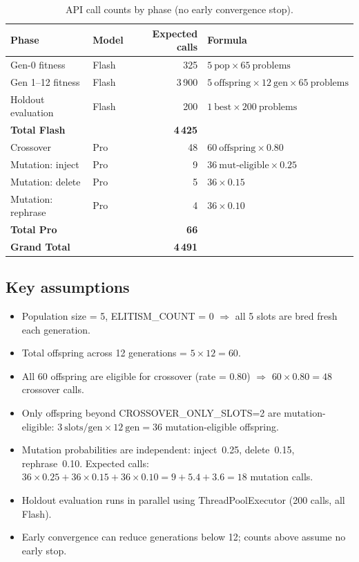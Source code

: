 \documentclass[11pt,a4paper]{report}
\begin{document}
\begin{table}[h]
\centering
\begin{tabular}{@{}llrl@{}}
\toprule
\textbf{Phase} & \textbf{Model} & \textbf{Expected calls} & \textbf{Formula} \\
\midrule
Gen-0 fitness       & Flash & 325    & $5\ \text{pop} \times 65\ \text{problems}$ \\
Gen 1--12 fitness   & Flash & 3\,900 & $5\ \text{offspring} \times 12\ \text{gen} \times 65\ \text{problems}$ \\
Holdout evaluation  & Flash & 200    & $1\ \text{best} \times 200\ \text{problems}$ \\
\midrule
\textbf{Total Flash}  & & \textbf{4\,425} & \\
\midrule
Crossover            & Pro & 48   & $60\ \text{offspring} \times 0.80$ \\
Mutation: inject     & Pro & 9    & $36\ \text{mut-eligible} \times 0.25$ \\
Mutation: delete     & Pro & 5    & $36 \times 0.15$ \\
Mutation: rephrase   & Pro & 4    & $36 \times 0.10$ \\
\midrule
\textbf{Total Pro}    & & \textbf{66} & \\
\midrule
\textbf{Grand Total}  & & \textbf{4\,491} & \\
\bottomrule
\end{tabular}
\caption{API call counts by phase (no early convergence stop).}
\label{tab:calls}
\end{table}

\subsection*{Key assumptions}

\begin{itemize}[nosep]
  \item Population size = 5, ELITISM\_COUNT = 0 $\Rightarrow$ all 5 slots are bred fresh each generation.
  \item Total offspring across 12 generations = $5 \times 12 = 60$.
  \item All 60 offspring are eligible for crossover (rate = 0.80) $\Rightarrow$ $60 \times 0.80 = 48$ crossover calls.
  \item Only offspring beyond CROSSOVER\_ONLY\_SLOTS=2 are mutation-eligible:
        $3\ \text{slots/gen} \times 12\ \text{gen} = 36$ mutation-eligible offspring.
  \item Mutation probabilities are independent: inject~0.25, delete~0.15, rephrase~0.10.
        Expected calls: $36 \times 0.25 + 36 \times 0.15 + 36 \times 0.10 = 9 + 5.4 + 3.6 = 18$ mutation calls.
  \item Holdout evaluation runs in parallel using ThreadPoolExecutor (200 calls, all Flash).
  \item Early convergence can reduce generations below 12; counts above assume no early stop.
\end{itemize}
\end{document}
